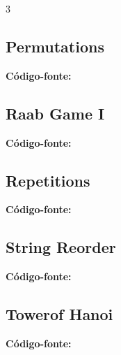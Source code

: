 \documentclass[8pt]{extarticle}
\begin{document}
\begin{multicols*}{3}
\subsection{Permutations}
\begin{caixaenunciado}

\end{caixaenunciado}
\vspace{0.3cm}
\noindent\textbf{Código-fonte:}


\subsection{Raab Game I}
\begin{caixaenunciado}

\end{caixaenunciado}
\vspace{0.3cm}
\noindent\textbf{Código-fonte:}


\subsection{Repetitions}
\begin{caixaenunciado}

\end{caixaenunciado}
\vspace{0.3cm}
\noindent\textbf{Código-fonte:}


\subsection{String Reorder}
\begin{caixaenunciado}

\end{caixaenunciado}
\vspace{0.3cm}
\noindent\textbf{Código-fonte:}


\subsection{Towerof Hanoi}
\begin{caixaenunciado}

\end{caixaenunciado}
\vspace{0.3cm}
\noindent\textbf{Código-fonte:}



\end{multicols*}
\end{document}

